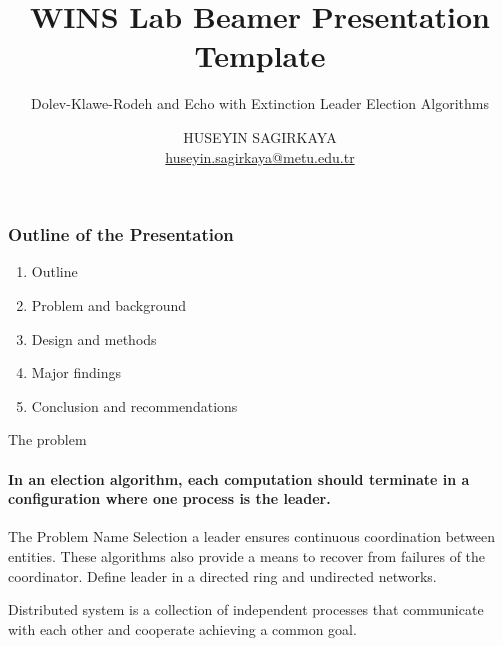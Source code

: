 \documentclass[11pt]{beamer}              %
\author[HUSEYIN SAGIRKAYA]{HUSEYIN SAGIRKAYA\\\href{mailto:huseyin.sagirkaya@metu.edu.tr}{huseyin.sagirkaya@metu.edu.tr}}
\title[WINS Beamer Template]{WINS Lab Beamer Presentation Template}
\subtitle[Distributed Computing Algorithms]{Dolev-Klawe-Rodeh and Echo with Extinction Leader Election Algorithms}
\begin{document}
\begin{frame}[plain]
\titlepage
{}
\end{frame}


\begin{frame}
    \frametitle{Outline of the Presentation}
   
\begin{enumerate}

\item Outline 
\item Problem and background
\item Design and methods
\item Major findings
\item Conclusion and recommendations 
\end{enumerate} 

\end{frame}



%
%


\begin{frame}{The problem}
\framesubtitle{In an election algorithm, each computation should terminate in a configuration where one process is the leader.}

\begin{block}{The Problem Name} 
Selection a leader ensures continuous coordination between entities. These algorithms also provide a means to recover from failures of the coordinator.
Define leader in a directed ring and undirected networks. 
\end{block}
Distributed system is a collection of independent processes that communicate with each other and cooperate achieving a common goal.

\note{}
\end{frame}
\end{document}

